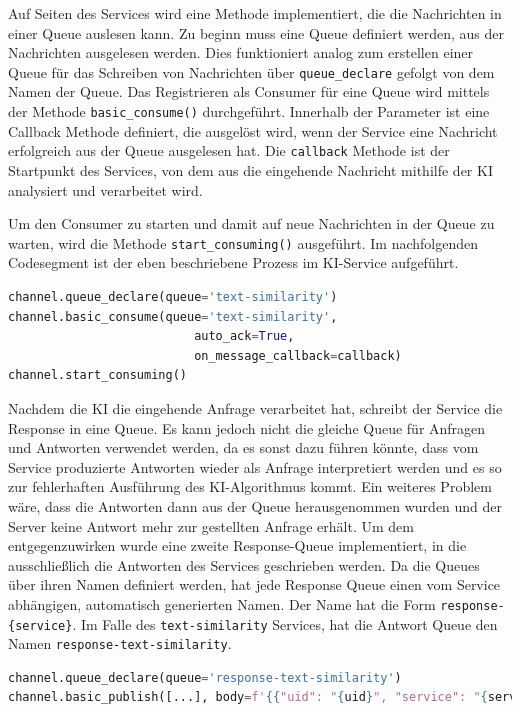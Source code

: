 Auf Seiten des Services wird eine Methode implementiert, die die Nachrichten in einer Queue auslesen kann. Zu beginn muss eine Queue definiert werden, aus der Nachrichten ausgelesen werden. Dies funktioniert analog zum erstellen einer Queue für das Schreiben von Nachrichten über \texttt{queue\_{}declare} gefolgt von dem Namen der Queue. Das Registrieren als Consumer für eine Queue wird mittels der Methode \texttt{basic\_{}consume()} durchgeführt. Innerhalb der Parameter ist eine Callback Methode definiert, die ausgelöst wird, wenn der Service eine Nachricht erfolgreich aus der Queue ausgelesen hat. Die \texttt{callback} Methode ist der Startpunkt des Services, von dem aus die eingehende Nachricht mithilfe der KI analysiert und verarbeitet wird.

Um den Consumer zu starten und damit auf neue Nachrichten in der Queue zu warten, wird die Methode \texttt{start\_{}consuming()} ausgeführt. Im nachfolgenden Codesegment ist der eben beschriebene Prozess im KI-Service aufgeführt.

\begin{lstlisting}[language=Python]
channel.queue_declare(queue='text-similarity')
channel.basic_consume(queue='text-similarity',
                          auto_ack=True,
                          on_message_callback=callback)
channel.start_consuming()
\end{lstlisting}

Nachdem die KI die eingehende Anfrage verarbeitet hat, schreibt der Service die Response in eine Queue. Es kann jedoch nicht die gleiche Queue für Anfragen und Antworten verwendet werden, da es sonst dazu führen könnte, dass vom Service produzierte Antworten wieder als Anfrage interpretiert werden und es so zur fehlerhaften Ausführung des KI-Algorithmus kommt. Ein weiteres Problem wäre, dass die Antworten dann aus der Queue herausgenommen wurden und der Server keine Antwort mehr zur gestellten Anfrage erhält. Um dem entgegenzuwirken wurde eine zweite \glqq Response-Queue\grqq{} implementiert, in die ausschließlich die Antworten des Services geschrieben werden. Da die Queues über ihren Namen definiert werden, hat jede Response Queue einen vom Service abhängigen, automatisch generierten Namen. Der Name hat die Form \texttt{response-\{service\}}. Im Falle des \texttt{text-similarity} Services, hat die Antwort Queue den Namen \texttt{response-text-similarity}. 

\begin{lstlisting}[language=Python]
channel.queue_declare(queue='response-text-similarity')
channel.basic_publish([...], body=f'{{"uid": "{uid}", "service": "{service}", "message": {json.dumps(message)}}}'.encode('utf-8'))
\end{lstlisting}


